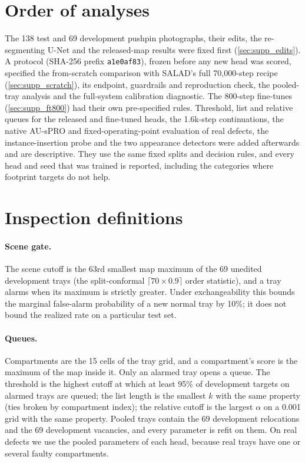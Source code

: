 \section{Order of analyses}
\label{sec:supp_order}
The 138 test and 69 development pushpin photographs, their edits, the re-segmenting U-Net and the released-map results were fixed first (\cref{sec:supp_edits}). A protocol (SHA-256 prefix \texttt{a1e0af83}), frozen before any new head was scored, specified the from-scratch comparison with SALAD's full 70{,}000-step recipe (\cref{sec:supp_scratch}), its endpoint, guardrails and reproduction check, the pooled-tray analysis and the full-system calibration diagnostic. The 800-step fine-tunes (\cref{sec:supp_ft800}) had their own pre-specified rules. Threshold, list and relative queues for the released and fine-tuned heads, the 1.6k-step continuations, the native AU-sPRO and fixed-operating-point evaluation of real defects, the instance-insertion probe and the two appearance detectors were added afterwards and are descriptive. They use the same fixed splits and decision rules, and every head and seed that was trained is reported, including the categories where footprint targets do not help.

\section{Inspection definitions}
\label{sec:supp_defs}
\paragraph{Scene gate.} The scene cutoff is the 63rd smallest map maximum of the 69 unedited development trays (the split-conformal $\lceil 70\times0.9\rceil$ order statistic), and a tray alarms when its maximum is strictly greater. Under exchangeability this bounds the marginal false-alarm probability of a new normal tray by 10\%; it does not bound the realized rate on a particular test set.
\paragraph{Queues.} Compartments are the 15 cells of the tray grid, and a compartment's score is the maximum of the map inside it. Only an alarmed tray opens a queue. The threshold is the highest cutoff at which at least 95\% of development targets on alarmed trays are queued; the list length is the smallest $k$ with the same property (ties broken by compartment index); the relative cutoff is the largest $\alpha$ on a 0.001 grid with the same property. Pooled trays contain the 69 development relocations and the 69 development vacancies, and every parameter is refit on them. On real defects we use the pooled parameters of each head, because real trays have one or several faulty compartments.
